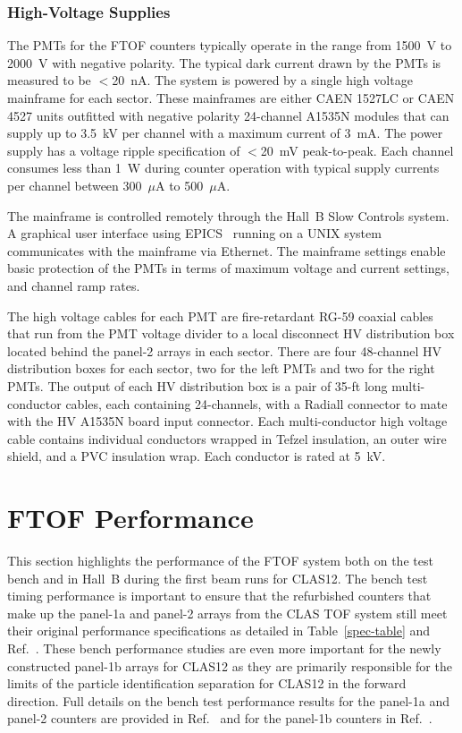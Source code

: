 \documentclass[3p,times,twocolumn]{elsarticle}
\begin{document}
\subsubsection{High-Voltage Supplies}

The PMTs for the FTOF counters typically operate in the range from 1500~V to 2000~V with negative
polarity. The typical dark current drawn by the PMTs is measured to be $<$20~nA. The system is powered
by a single high voltage mainframe for each sector. These mainframes are either CAEN 1527LC or CAEN 4527
units outfitted with negative polarity 24-channel A1535N modules that can supply up to 3.5~kV per channel with
a maximum current of 3~mA. The power supply has a voltage ripple specification of $<$20~mV peak-to-peak.
Each channel consumes less than 1~W during counter operation with typical supply currents per channel between
300~$\mu$A to 500~$\mu$A.

The mainframe is controlled remotely through the Hall~B Slow Controls system. A graphical user interface
using EPICS~\cite{epics} running on a UNIX system communicates with the mainframe via Ethernet. The
mainframe settings enable basic protection of the PMTs in terms of maximum voltage and current settings,
and channel ramp rates.

The high voltage cables for each PMT are fire-retardant RG-59 coaxial cables that run from the PMT
voltage divider to a local disconnect HV distribution box located behind the panel-2 arrays in each
sector. There are four 48-channel HV distribution boxes for each sector, two for the left PMTs and two
for the right PMTs. The output of each HV distribution box is a pair of 35-ft long multi-conductor cables,
each containing 24-channels, with a Radiall connector to mate with the HV A1535N board input connector.
Each multi-conductor high voltage cable contains individual conductors wrapped in Tefzel insulation, an outer
wire shield, and a PVC insulation wrap. Each conductor is rated at 5~kV.

\section{FTOF Performance}
\label{sec:performance}

This section highlights the performance of the FTOF system both on the test bench and in Hall~B during
the first beam runs for CLAS12. The bench test timing performance is important to ensure that the
refurbished counters that make up the panel-1a and panel-2 arrays from the CLAS TOF system still meet
their original performance specifications as detailed in Table~\ref{spec-table} and Ref.~\cite{tof-nim}. These
bench performance studies are even more important for the newly constructed panel-1b arrays for CLAS12
as they are primarily responsible for the limits of the particle identification separation for CLAS12 in the
forward direction. Full details on the bench test performance results for the panel-1a and panel-2 counters
are provided in Ref.~\cite{dsc-cn2013-001} and for the panel-1b counters in Ref.~\cite{nim-p1b}.
\end{document}
